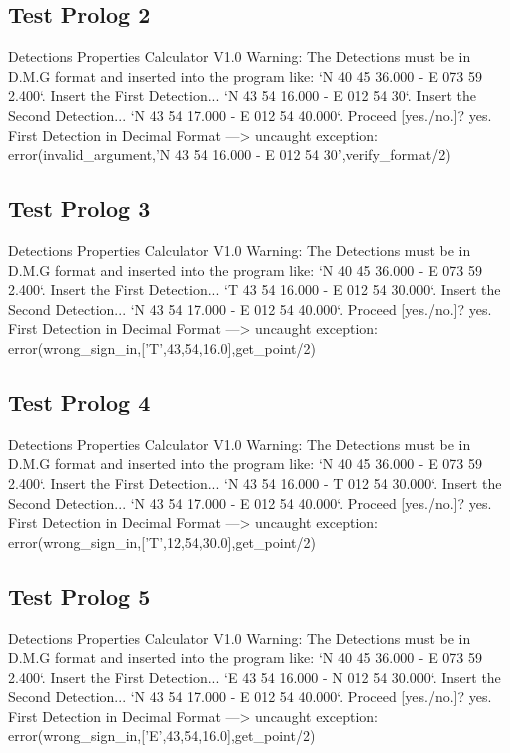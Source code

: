 \documentclass{article}
\begin{document}
\subsection*{Test Prolog 2}
	\begin{spverbatim}
		Detections Properties Calculator V1.0
		Warning: The Detections must be in D.M.G format and inserted into the program like: `N 40 45 36.000 - E 073 59 2.400`.
		Insert the First Detection...
		`N 43 54 16.000 - E 012 54 30`.
		Insert the Second Detection...
		`N 43 54 17.000 - E 012 54 40.000`.
		Proceed [yes./no.]?
		yes.
		First Detection in Decimal Format ---> 
		uncaught exception: error(invalid_argument,'N 43 54 16.000 - E 012 54 30',verify_format/2)
	\end{spverbatim}

\subsection*{Test Prolog 3}
	\begin{spverbatim}
		Detections Properties Calculator V1.0
		Warning: The Detections must be in D.M.G format and inserted into the program like: `N 40 45 36.000 - E 073 59 2.400`.
		Insert the First Detection...
		`T 43 54 16.000 - E 012 54 30.000`.
		Insert the Second Detection...
		`N 43 54 17.000 - E 012 54 40.000`.
		Proceed [yes./no.]?
		yes.
		First Detection in Decimal Format ---> 
		uncaught exception: error(wrong_sign_in,['T',43,54,16.0],get_point/2)
	\end{spverbatim}

\subsection*{Test Prolog 4}
	\begin{spverbatim}
		Detections Properties Calculator V1.0
		Warning: The Detections must be in D.M.G format and inserted into the program like: `N 40 45 36.000 - E 073 59 2.400`.
		Insert the First Detection...
		`N 43 54 16.000 - T 012 54 30.000`.
		Insert the Second Detection...
		`N 43 54 17.000 - E 012 54 40.000`.
		Proceed [yes./no.]?
		yes.
		First Detection in Decimal Format ---> 
		uncaught exception: error(wrong_sign_in,['T',12,54,30.0],get_point/2)
	\end{spverbatim}

\subsection*{Test Prolog 5}
	\begin{spverbatim}
		Detections Properties Calculator V1.0
		Warning: The Detections must be in D.M.G format and inserted into the program like: `N 40 45 36.000 - E 073 59 2.400`.
		Insert the First Detection...
		`E 43 54 16.000 - N 012 54 30.000`.
		Insert the Second Detection...
		`N 43 54 17.000 - E 012 54 40.000`.
		Proceed [yes./no.]?
		yes.
		First Detection in Decimal Format ---> 
		uncaught exception: error(wrong_sign_in,['E',43,54,16.0],get_point/2)
	\end{spverbatim}
\end{document}
